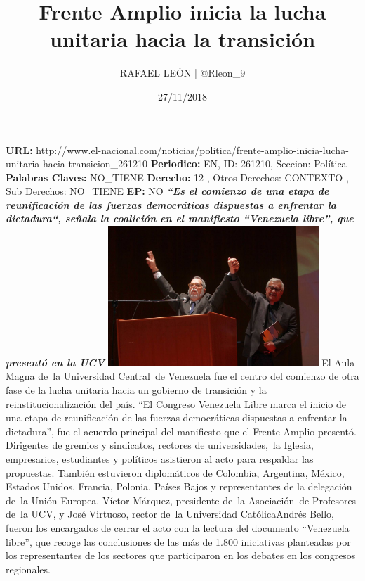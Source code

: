 \documentclass{article}%
\title{\textbf{Frente Amplio inicia la lucha unitaria hacia la transición}}%
\author{RAFAEL LEÓN | @Rleon\_9}%
\date{27/11/2018}%
\begin{document}
%
\normalsize%
\maketitle%
\textbf{URL: }%
http://www.el{-}nacional.com/noticias/politica/frente{-}amplio{-}inicia{-}lucha{-}unitaria{-}hacia{-}transicion\_261210\newline%
%
\textbf{Periodico: }%
EN, %
ID: %
261210, %
Seccion: %
Política\newline%
%
\textbf{Palabras Claves: }%
NO\_TIENE\newline%
%
\textbf{Derecho: }%
12%
, Otros Derechos: %
CONTEXTO%
, Sub Derechos: %
NO\_TIENE%
\newline%
%
\textbf{EP: }%
NO\newline%
\newline%
%
\textbf{\textit{“Es el comienzo de una etapa de reunificación de las fuerzas democráticas dispuestas a enfrentar la dictadura“, señala la coalición en el manifiesto “Venezuela libre”, que presentó en la UCV}}%
\newline%
\newline%
%
\includegraphics[width=300px]{140.jpg}%
\newline%
%
El Aula Magna de~la Universidad Central~de Venezuela fue el centro del comienzo de otra fase de la lucha unitaria hacia un gobierno de transición y la reinstitucionalización del país. “El Congreso Venezuela Libre marca el inicio de una etapa de reunificación de las fuerzas democráticas dispuestas a enfrentar la dictadura”, fue el acuerdo principal del manifiesto que el Frente Amplio presentó.%
\newline%
%
Dirigentes de gremios y sindicatos, rectores de universidades,~la Iglesia, empresarios, estudiantes y políticos asistieron al acto para respaldar las propuestas. También estuvieron diplomáticos de Colombia, Argentina, México, Estados Unidos, Francia, Polonia, Países Bajos y representantes de la delegación de~la Unión Europea.%
\newline%
%
Víctor Márquez, presidente de~la Asociación~de Profesores de~la UCV, y José Virtuoso, rector de~la Universidad CatólicaAndrés Bello, fueron los encargados de cerrar el acto con la lectura del documento “Venezuela libre”, que recoge las conclusiones de las más de 1.800 iniciativas planteadas por los representantes de los sectores que participaron en los debates en los congresos regionales.%
\end{document}

